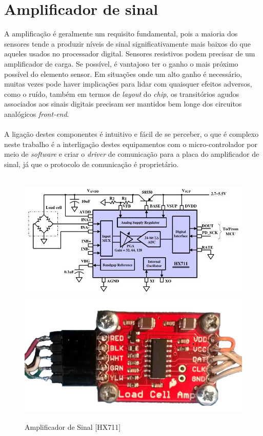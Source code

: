 \section{Amplificador de sinal}
A amplificação é geralmente um requisito fundamental, pois a maioria dos sensores tende a produzir níveis de sinal significativamente mais baixos do que aqueles usados no processador digital. Sensores resistivos podem precisar de um amplificador de carga. Se possível, é vantajoso ter o ganho o mais próximo possível do elemento sensor. Em situações onde um alto ganho é necessário, muitas vezes pode haver implicações para lidar 
com quaisquer efeitos adversos, como o ruído, também em termos de \textit{layout} do \textit{chip}, os transitórios agudos associados aos sinais digitais precisam ser mantidos bem longe dos circuitos analógicos \textit{front-end}. \cite{book-9}
\\
\\
A ligação destes componentes é intuitivo e fácil de se perceber, o que é complexo neste trabalho é a interligação destes equipamentos com o micro-controlador por meio de \textit{software} e criar o \textit{driver} de comunicação para a placa do amplificador de sinal, já que o protocolo de comunicação é proprietário.
\\
\\
\begin{figure}[H]
	\captionsetup{justification=raggedright,singlelinecheck=false}
	\centering
	\includegraphics[scale=0.35]{./image/PESTA/schematic/HX711_Schematic_1.jpg}
	\includegraphics[scale=0.1]{./image/PESTA/material/HX711_board_1.jpg}
	\caption{Amplificador de Sinal [HX711]}
	\label{HX711_Schematic_1}
\end{figure}
